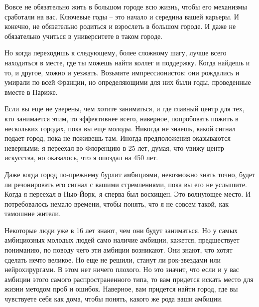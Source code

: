 \documentclass[ebook,12pt,oneside,openany]{memoir}
\begin{document}
Вовсе не обязательно жить в большом городе всю жизнь, чтобы его
механизмы сработали на вас. Ключевые годы – это начало и середина
вашей карьеры. И конечно, не обязательно родиться и взрослеть в
большом городе. И даже не обязательно учиться в университете в таком
городе. \newline

Но когда переходишь к следующему, более сложному шагу, лучше всего
находиться в месте, где ты можешь найти коллег и поддержку. Когда
найдешь и то, и другое, можно и уезжать. Возьмите импрессионистов: они
рождались и умирали по всей Франции, но определяющими для них были
годы, проведенные вместе в Париже. \newline

Если вы еще не уверены, чем хотите заниматься, и где главный центр для
тех, кто занимается этим, то эффективнее всего, наверное, попробовать
пожить в нескольких городах, пока вы еще молоды. Никогда не знаешь,
какой сигнал подает город, пока не поживешь там. Иногда предположения
оказываются неверными: я переехал во Флоренцию в 25 лет, думая, что
увижу центр искусства, но оказалось, что я опоздал на 450 лет. \newline

Даже когда город по-прежнему бурлит амбициями, невозможно знать точно,
будет ли резонировать его сигнал с вашими стремлениями, пока вы его не
услышите. Когда я переехал в Нью-Йорк, я сперва был восхищен. Это
волнующее место. И потребовалось немало времени, чтобы понять, что я
не совсем такой, как тамошние жители. \newline

Некоторые люди уже в 16 лет знают, чем они будут заниматься. Но у
самых амбициозных молодых людей само наличие амбиции, кажется,
предшествует пониманию, по поводу чего эти амбиции возникают. Они
знают, что хотят сделать нечто великое. Но еще не решили, станут ли
рок-звездами или нейрохирургами. В этом нет ничего плохого. Но это
значит, что если и у вас амбиции этого самого распространенного типа,
то вам придется искать место для жизни методом проб и ошибок.
Наверное, вам придется найти город, где вы чувствуете себя как дома,
чтобы понять, какого же рода ваши амбиции.
\end{document}
